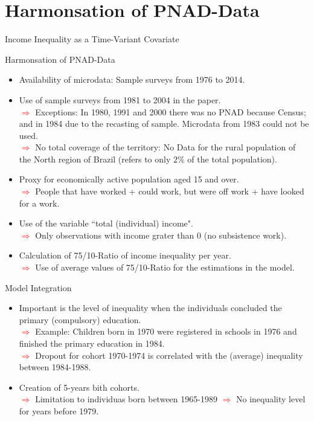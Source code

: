 \documentclass{beamer}
\begin{document}
\section{Harmonsation of PNAD-Data}
\begin{frame}[label=Harmonsation]{Income Inequality as a Time-Variant Covariate}
\vspace{-0.3cm}		
\begin{block}{\centering Harmonsation of PNAD-Data}
\begin{itemize}
\item \scriptsize Availability of microdata: Sample surveys from 1976 to 2014.
\item \scriptsize Use of sample surveys from 1981 to 2004 in the paper. \\ \tiny \textcolor{red}{$\Longrightarrow$} Exceptions: In 1980, 1991 and 2000 there was no PNAD because Census; and in 1984 due to the recasting of sample. Microdata from 1983 could not be used.
\\ \tiny \textcolor{red}{$\Longrightarrow$} No total coverage of the territory: No Data for the rural population of the North region of Brazil (refers to only $2\%$ of the total population).
\item \scriptsize Proxy for economically active population aged 15 and over.  \\ \tiny \textcolor{red}{$\Longrightarrow$} People that have worked + could work, but were off work + have looked for a work.
\item \scriptsize Use of the variable ``total (individual) income".
\\ \tiny \textcolor{red}{$\Longrightarrow$} Only observations with income grater than 0 (no subsistence work).
\item \scriptsize Calculation of 75/10-Ratio of income inequality per year.
\\ \tiny \textcolor{red}{$\Longrightarrow$} Use of average values of 75/10-Ratio for the estimations in the model.
\end{itemize}
\end{block}

\vspace{-0.2cm}	
\begin{block}{\centering Model Integration}
\begin{itemize}
\item \scriptsize Important is the level of inequality when the individuals concluded the primary (compulsory) education.
 \\ \tiny \textcolor{red}{$\Longrightarrow$} Example: Children born in 1970 were registered in schools in 1976 and finished the primary education in 1984.
 \\ \tiny \textcolor{red}{$\Longrightarrow$} Dropout for cohort 1970-1974 is correlated with the (average) inequality between 1984-1988.
 \item \scriptsize Creation of 5-years bith cohorts. 
\\ \tiny \textcolor{red}{$\Longrightarrow$} Limitation to individuas born between 1965-1989 \textcolor{red}{$\Longrightarrow$} No inequality level for years before 1979.
\end{itemize}
\end{block}


\end{frame}
\end{document}
